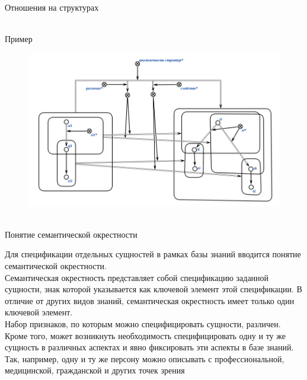 \begin{frame}{\\Отношения на структурах}
	\topline
	\justifying
	
\end{frame}

\begin{frame}{\\Пример}
	\topline
	\justifying
	
	\begin{figure}[b]
		\includegraphics[scale=0.3]{./figures/sd_structures/analog.png}
	\end{figure}
\end{frame}

\begin{frame}{\\Понятие семантической окрестности}
	\topline
	\justifying
	
	\vspace{5mm}
	Для спецификации отдельных сущностей в рамках базы знаний вводится понятие семантической окрестности.\\
	Семантическая окрестность представляет собой спецификацию заданной сущности, знак которой указывается
	как ключевой элемент этой спецификации. В отличие от других видов знаний, семантическая окрестность имеет
	только один ключевой элемент.\\
	Набор признаков, по которым можно специфицировать сущности, различен. Кроме того, может возникнуть необходимость специфицировать одну и ту же сущность в различных аспектах и явно фиксировать эти аспекты в базе
	знаний.\\
	Так, например, одну и ту же персону можно описывать с профессиональной, медицинской, гражданской и других
	точек зрения
\end{frame}

